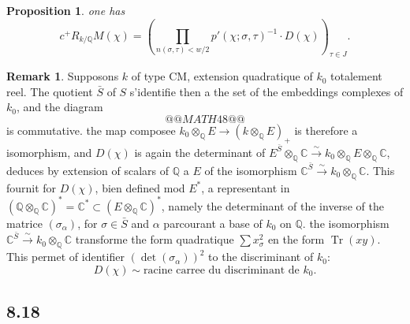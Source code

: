 \documentclass[12pt,a4paper]{article}
\theoremstyle{plain}
\newtheorem{proposition}[theorem]{Proposition}
\theoremstyle{definition}
\newtheorem{remark}[definition]{Remark}
\theoremstyle{remark}
\DeclareMathOperator{\Tr}{Tr}
\newcommand{\Q}{\mathbb{Q}}
\newcommand{\C}{\mathbb{C}}
\begin{document}
\begin{proposition}\label{prop:8.16}
one has
\[
c^+ R_{k/\Q} M(\chi) = \left(\prod_{n(\sigma,\tau) < w/2} p'(\chi; \sigma, \tau)^{-1} \cdot D(\chi)\right)_{\tau \in J}.
\]
\end{proposition}

\begin{remark}
Supposons $k$ of type CM, extension quadratique of $k_0$ totalement reel. The quotient
$\bar{S}$ of $S$ s'identifie then a the set of the embeddings complexes of $k_0$, and the
diagram
\[
@@MATH48@@
\]
is commutative. the map composee $k_0 \otimes_\Q E \to (k \otimes_\Q E)_+$ is therefore
a isomorphism, and $D(\chi)$ is again the determinant of $E^{\bar{S}} \otimes_\Q \C \xrightarrow{\sim}
k_0 \otimes_\Q E \otimes_\Q \C$, deduces by extension of scalars of $\Q$ a $E$ of
the isomorphism $\C^{\bar{S}} \xrightarrow{\sim} k_0 \otimes_\Q \C$. This fournit for $D(\chi)$, bien
defined mod $E^*$, a representant in $(\Q \otimes_\Q \C)^* = \C^* \subset (E \otimes_\Q \C)^*$,
namely the determinant of the inverse of the matrice $(\sigma_\alpha)$, for $\sigma \in \bar{S}$ and
$\alpha$ parcourant a base of $k_0$ on $\Q$. the isomorphism $\C^{\bar{S}} \xrightarrow{\sim} k_0 \otimes_\Q \C$
transforme the form quadratique $\sum x_\sigma^2$ en the form $\Tr(xy)$. This permet
of identifier $(\det(\sigma_\alpha))^2$ to the discriminant of $k_0$:
\[
D(\chi) \sim \text{racine carree du discriminant de } k_0.
\]
\end{remark}

\subsection*{8.18}
\end{document}
